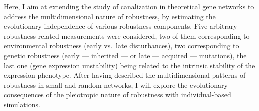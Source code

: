 \documentclass[10pt,a4paper]{article}
\begin{document}
Here, I aim at extending the study of canalization in theoretical gene networks to address the multidimensional nature of robustness, by estimating the evolutionary independence of various robustness components. Five arbitrary robustness-related measurements were considered, two of them corresponding to environmental robustness (early vs.\ late disturbances), two corresponding to genetic robustness (early --- inherited --- or late --- acquired --- mutations), the last one (gene expression unstability) being related to the intrinsic stability of the expression phenotype. After having described the multidimensional patterns of robustness in small and random networks, I will explore the evolutionary consequences of the pleiotropic nature of robustness with individual-based simulations. 



















\end{document}
